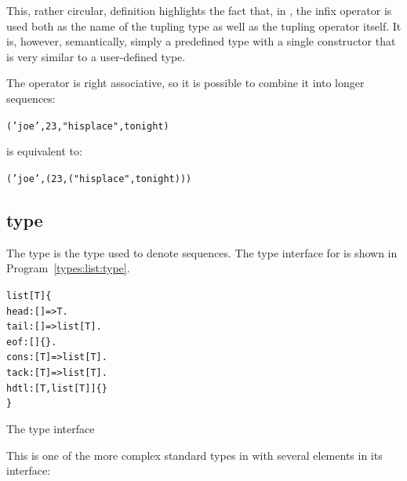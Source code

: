 This, rather circular, definition highlights the fact that, in \go, the \q{,} infix operator is used both as the name of the tupling type as well as the tupling operator itself. It is, however, semantically, simply a predefined type with a single constructor that is very similar to a user-defined type.

The \q{,} operator is right associative, so it is possible to combine it into longer sequences:
\begin{alltt}
('joe',23,"his place",tonight)
\end{alltt}
is equivalent to:
\begin{alltt}
('joe',(23,("his place",tonight)))
\end{alltt}

\subsection{ type}
\label{types:list}
The  type is the type used to denote sequences. The type interface for  is shown in Program~\ref{types:list:type}.
\begin{program}
\vspace{0.5ex}
\begin{alltt}
list[T] \impl{} \{
  head:[]=>T.
  tail:[]=>list[T].
  eof:[]\{\}.
  cons:[T]=>list[T].
  tack:[T]=>list[T].
  hdtl:[T,list[T]]\{\}
\}
\end{alltt}
\vspace{-2ex}
\caption{The  type interface}
\label{types:list:type}
\end{program}
This is one of the more complex standard types in \go with several elements in its interface:

